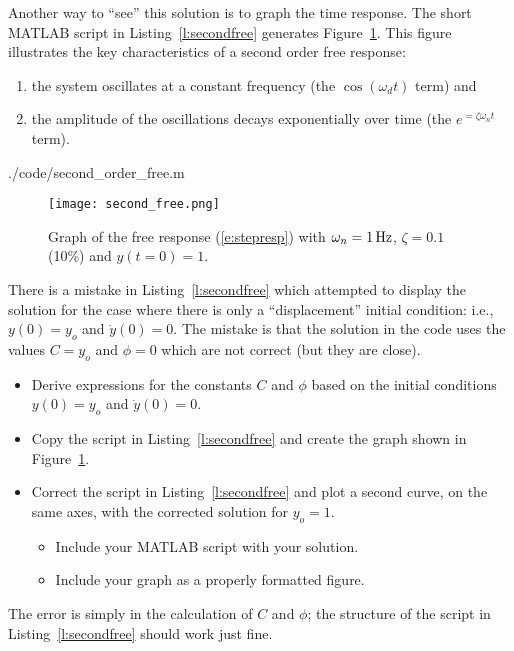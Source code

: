 Another way to ``see'' this solution is to graph the time response.  The short MATLAB script in Listing~\ref{l:secondfree} generates Figure~\ref{f:secondfree}.  This figure illustrates the key characteristics of a second order free response:
\begin{enumerate}
\item the system oscillates at a constant frequency (the $\cos(\omega_d t)$ term) and
\item the amplitude of the oscillations decays exponentially over time (the $e^{=\zeta \omega_n t}$ term).
\end{enumerate}
%


{./code/second_order_free.m}


\begin{figure}[hbt]
\centering
\texttt{[image: second\_free.png]}
\caption{Graph of the free response (\ref{e:stepresp}) with $\omega_n= \unit[1]{Hz}$, $\zeta=0.1$ (10\%) and $y(t=0)=1$.}
\label{f:secondfree}
\end{figure}

\begin{ex}
There is a mistake in Listing~\ref{l:secondfree} which attempted to display the solution for the case where there is only a ``displacement'' initial condition: i.e., $y(0)=y_o$ and $\dot{y}(0)=0$.  The mistake is that the solution in the code uses the values $C=y_o$ and $\phi=0$ which are not correct (but they are close). 
\begin{itemize}
\item Derive expressions for the constants $C$ and $\phi$ based on the initial conditions $y(0)=y_o$ and $\dot{y}(0)=0$.
\item Copy the script in Listing~\ref{l:secondfree} and create the graph shown in Figure~\ref{f:secondfree}.
\item Correct the script in Listing~\ref{l:secondfree} and plot a second curve, on the same axes, with the corrected solution for $y_o=1$.  
  \begin{itemize}
  \item Include your MATLAB script with your solution.
  \item Include your graph as a properly formatted figure.
  \end{itemize}
\end{itemize}
The error is simply in the calculation of $C$ and $\phi$; the structure of the script in Listing~\ref{l:secondfree} should work just fine.
\end{ex}

